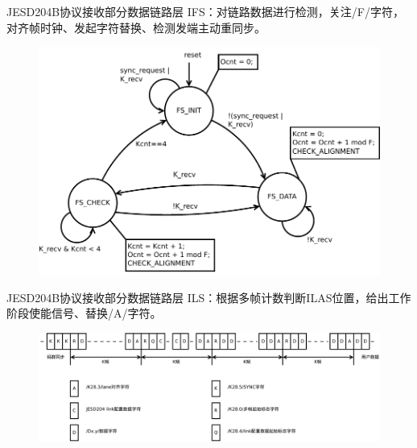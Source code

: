\documentclass{beamer}
\begin{document}
\begin{frame}{JESD204B协议接收部分}{数据链路层}
  IFS：对链路数据进行检测，关注/F/字符，对齐帧时钟、发起字符替换、检测发端主动重同步。
  \begin{figure}
	\centering
	\includegraphics[scale=0.45]{./img/ifs_fsm_resync.pdf}
	\end{figure}
\end{frame}

\begin{frame}{JESD204B协议接收部分}{数据链路层}
  ILS：根据多帧计数判断ILAS位置，给出工作阶段使能信号、替换/A/字符。
  \begin{figure}
	\centering
	\includegraphics[scale=0.5]{./img/ilas.pdf}
	\end{figure}
\end{frame}
\end{document}
